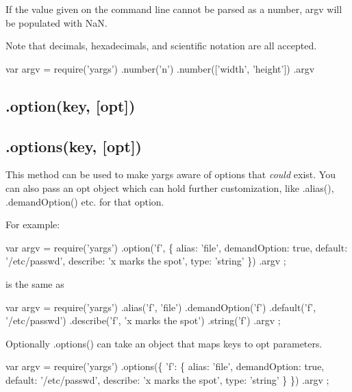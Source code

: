 If the value given on the command line cannot be parsed as a number, {\ttfamily argv} will be populated with {\ttfamily NaN}.

Note that decimals, hexadecimals, and scientific notation are all accepted.


\begin{DoxyCode}
var argv = require('yargs')
  .number('n')
  .number(['width', 'height'])
  .argv
\end{DoxyCode}


\subsection*{.option(key, \mbox{[}opt\mbox{]}) }

\subsection*{.options(key, \mbox{[}opt\mbox{]}) }

This method can be used to make yargs aware of options that {\itshape could} exist. You can also pass an {\ttfamily opt} object which can hold further customization, like {\ttfamily .alias()}, {\ttfamily .demand\+Option()} etc. for that option.

For example\+:


\begin{DoxyCode}
var argv = require('yargs')
    .option('f', \{
        alias: 'file',
        demandOption: true,
        default: '/etc/passwd',
        describe: 'x marks the spot',
        type: 'string'
    \})
    .argv
;
\end{DoxyCode}


is the same as


\begin{DoxyCode}
var argv = require('yargs')
    .alias('f', 'file')
    .demandOption('f')
    .default('f', '/etc/passwd')
    .describe('f', 'x marks the spot')
    .string('f')
    .argv
;
\end{DoxyCode}


Optionally {\ttfamily .options()} can take an object that maps keys to {\ttfamily opt} parameters.


\begin{DoxyCode}
var argv = require('yargs')
    .options(\{
      'f': \{
        alias: 'file',
        demandOption: true,
        default: '/etc/passwd',
        describe: 'x marks the spot',
        type: 'string'
      \}
    \})
    .argv
;
\end{DoxyCode}


